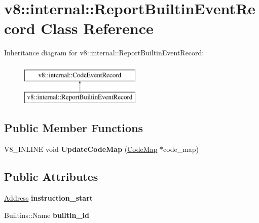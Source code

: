 \hypertarget{classv8_1_1internal_1_1ReportBuiltinEventRecord}{}\section{v8\+:\+:internal\+:\+:Report\+Builtin\+Event\+Record Class Reference}
\label{classv8_1_1internal_1_1ReportBuiltinEventRecord}
Inheritance diagram for v8\+:\+:internal\+:\+:Report\+Builtin\+Event\+Record\+:\begin{figure}[H]
\begin{center}
\leavevmode
\includegraphics[height=2.000000cm]{classv8_1_1internal_1_1ReportBuiltinEventRecord}
\end{center}
\end{figure}
\subsection*{Public Member Functions}
\begin{DoxyCompactItemize}
\item 
\mbox{\label{classv8_1_1internal_1_1ReportBuiltinEventRecord_a2948ee4b4d35dd4ed5cc0ba2d1137f84}} 
V8\+\_\+\+I\+N\+L\+I\+NE void {\bfseries Update\+Code\+Map} (\mbox{\hyperlink{classv8_1_1internal_1_1CodeMap}{Code\+Map}} $\ast$code\+\_\+map)
\end{DoxyCompactItemize}
\subsection*{Public Attributes}
\begin{DoxyCompactItemize}
\item 
\mbox{\label{classv8_1_1internal_1_1ReportBuiltinEventRecord_a44fc6d8b654cad64ad52a92234b7f46c}} 
\mbox{\hyperlink{classuintptr__t}{Address}} {\bfseries instruction\+\_\+start}
\item 
\mbox{\label{classv8_1_1internal_1_1ReportBuiltinEventRecord_ab06c795d55d0154ee34481488999df31}} 
Builtins\+::\+Name {\bfseries builtin\+\_\+id}
\end{DoxyCompactItemize}
